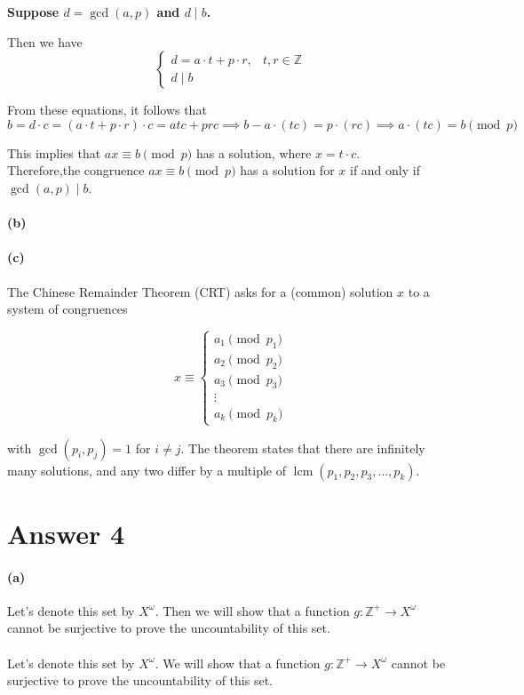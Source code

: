 \documentclass[12pt]{article}
\begin{document}
\textbf{Suppose $d = \gcd(a, p)$ and $d \mid b$.}

Then we have
\[
\begin{cases}
    d = a \cdot t + p \cdot r, & \text{$t, r \in \mathbb{Z}$} \\
    d \mid b
\end{cases}
\]

From these equations, it follows that
\[
b = d \cdot c = (a \cdot t + p \cdot r) \cdot c = atc + prc \implies b - a \cdot (tc) = p \cdot (rc) \implies a \cdot (tc) = b \pmod{p}
\]

This implies that $ax \equiv b \pmod{p}$ has a solution, where $x = t \cdot c$. \\

Therefore,the congruence $ax \equiv b \pmod{p}$ has a solution for $x$ if and only if $\gcd(a, p) \mid b$.
\paragraph{(b)}
\paragraph{(c)}
The Chinese Remainder Theorem (CRT) asks for a (common) solution \(x\) to a system of congruences

\[ x \equiv \begin{cases} a_1 \pmod{p_1} \\ a_2 \pmod{p_2} \\ a_3 \pmod{p_3} \\ \vdots \\ a_k \pmod{p_k} \end{cases} \]

with \(\gcd(p_i, p_j) = 1\) for \(i \neq j\). The theorem states that there are infinitely many solutions, and any two differ by a multiple of \(\operatorname{lcm}(p_1, p_2, p_3, \ldots, p_k)\).


\section*{Answer 4}
\paragraph{(a)}
Let's denote this set by \(X^{\omega}\). Then we will show that a function \(g : \mathbb{Z}^+ \rightarrow X^{\omega}\) cannot be surjective
to prove the uncountability of this set.
\\ \\
Let's denote this set by \(X^\omega\). We will show that a function \(g:\mathbb{Z}^+ \rightarrow X^\omega\) cannot be surjective to prove the uncountability of this set.
\end{document}
